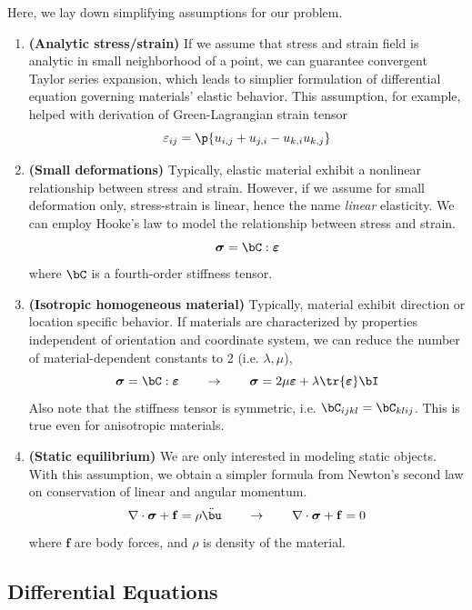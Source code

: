 \documentclass[11pt,titlepage]{article}
\newcommand{\bheading}[1]{\textbf{(#1)}}
\newcommand{\bsigma}{\boldsymbol{\sigma}}
\newcommand{\bepsilon}{\boldsymbol{\varepsilon}}
\renewcommand{\epsilon}{\varepsilon}
\renewcommand{\bf}{\mathbf{f}}
\begin{document}
Here, we lay down simplifying assumptions for our problem.
\begin{enumerate}
    \item \bheading{Analytic stress/strain} If we assume that stress and strain field is analytic in small neighborhood of a point, we can guarantee convergent Taylor series expansion, which leads to simplier formulation of differential equation governing materials' elastic behavior. This assumption, for example, helped with derivation of Green-Lagrangian strain tensor
    \[
        \epsilon_{ij} = \p{u_{i,j} + u_{j,i} - u_{k,i}u_{k,j}}    
    \]
    \item \bheading{Small deformations} Typically, elastic material exhibit a nonlinear relationship between stress and strain. However, if we assume for small deformation only, stress-strain is linear, hence the name \textit{linear} elasticity. We can employ Hooke's law to model the relationship between stress and strain.
    \[
        \bsigma = \bC : \bepsilon
    \]
    where $\bC$ is a fourth-order stiffness tensor.
    \item \bheading{Isotropic homogeneous material} Typically, material exhibit direction or location specific behavior. If materials are characterized by properties independent of orientation and coordinate system, we can reduce the number of material-dependent constants to 2 (i.e. $\lambda,\mu$),
    \[
        \bsigma = \bC : \bepsilon
        \quad \quad \rightarrow \quad \quad
        \bsigma = 2\mu\bepsilon + \lambda \tr{\bepsilon} \bI
    \]
    Also note that the stiffness tensor is symmetric, i.e. $\bC_{ijkl} = \bC_{klij}$. This is true even for anisotropic materials.
    \item \bheading{Static equilibrium} We are only interested in modeling static objects. With this assumption, we obtain a simpler formula from Newton's second law on conservation of linear and angular momentum.
    \[
        \nabla\cdot\bsigma + \bf = \rho \ddot{\bu}
        \quad \quad \rightarrow \quad \quad
        \nabla\cdot\bsigma + \bf = 0
    \]
    where $\bf$ are body forces, and $\rho$ is density of the material.
\end{enumerate}


\subsection{Differential Equations}
\end{document}
